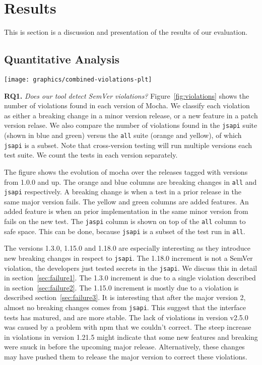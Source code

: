 \section{Results}

This is section is a discussion and presentation of the results of our
evaluation.

\subsection{Quantitative Analysis}

\begin{figure*}
\centering
\texttt{[image: graphics/combined-violations-plt]}
\caption{Violations per version. {\tt jsapi} is a subset of violations found in {\tt all}}
\label{fig:violations}
\end{figure*}

{\bf RQ1.} {\em Does our tool detect SemVer violations?}
Figure~\ref{fig:violations} shows the number of violations found in
each version of Mocha.  We classify each violation as either a
breaking change in a minor version release, or a new feature in a
patch version relase. We also compare the number of violations found
in the {\tt jsapi} suite (shown in blue and green) versus the {\tt all}
suite (orange and yellow), of which {\tt jsapi} is a subset. Note that
cross-version testing will run multiple versions each test suite. We
count the tests in each version separately.

The figure shows the evolution of mocha over the releases tagged with
versions from 1.0.0 and up. The orange and blue columns are breaking
changes in {\tt all} and {\tt jsapi} respectively. A breaking change is when
a test in a prior release in the same major version fails. The yellow
and green columns are added features. An added feature is when an
prior implementation in the same minor version from fails on the new 
test. The {\tt jaspi} column is shown on top of the {\tt all} column to
safe space. This can be done, because {\tt jsapi} is a subset of the 
test run in {\tt all}.

The versions 1.3.0, 1.15.0 and 1.18.0 are especially interesting as they
introduce new breaking changes in respect to {\tt jsapi}.  The 1.18.0
increment is not a SemVer violation, the developers just tested secrets
in the {\tt jsapi}.  We discuss this in detail in
section~\ref{sec:failure1}.  The 1.3.0 increment is due to a single
violation described in section~\ref{sec:failure2}. The 1.15.0 increment
is mostly due to a violation is described section~\ref{sec:failure3}. It
is interesting that after the major version 2, almost no breaking
changes comes from {\tt jsapi}. This suggest that the interface tests
has matured, and are more stable. The lack of violations in version
v2.5.0 was caused by a problem with npm that we couldn't correct. The
steep increase in violations in version 1.21.5 might indicate that some
new features and breaking were snuck in before the upcoming major
release. Alternatively, these changes may have pushed them to release
the major version to correct these violations.

